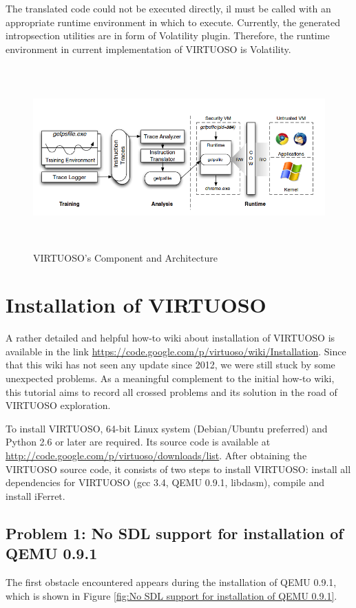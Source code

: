 The translated code could not be executed directly, il must be called with an appropriate runtime environment in which to execute. Currently, the
generated intropsection utilities are in form of Volatility plugin. Therefore, the runtime environment in current implementation of VIRTUOSO is 
Volatility.
  
\begin{figure}[htbp]
	\centering
		\includegraphics[width=14cm, height= 7cm ]{Figures/FigureVirtuoso.png}
	\caption{VIRTUOSO's Component and Architecture \cite{Reference27}}
	\label{fig:VIRTUOSO's Component and Architecture}
\end{figure}

\section{Installation of VIRTUOSO}

A rather detailed and helpful how-to wiki about installation of VIRTUOSO is available in the link 
\url{https://code.google.com/p/virtuoso/wiki/Installation}. Since that this wiki has not seen any update since 2012, 
we were still stuck by some unexpected problems.  As a meaningful complement to the initial how-to wiki, this tutorial aims to record 
all crossed problems and its solution in the road of VIRTUOSO exploration.

To install VIRTUOSO, 64-bit Linux system (Debian/Ubuntu preferred) and Python 2.6 or later are required. Its source code is available at 
\url{http://code.google.com/p/virtuoso/downloads/list}. After obtaining the VIRTUOSO source code, it consists of two steps to install VIRTUOSO:
install all dependencies for VIRTUOSO (gcc 3.4, QEMU 0.9.1, libdasm), compile and install iFerret.

\subsection{Problem 1: No SDL support for installation of QEMU 0.9.1}
The first obstacle encountered appears during the installation of QEMU 0.9.1, which is shown in Figure \ref{fig:No SDL support for installation of QEMU 0.9.1}.

